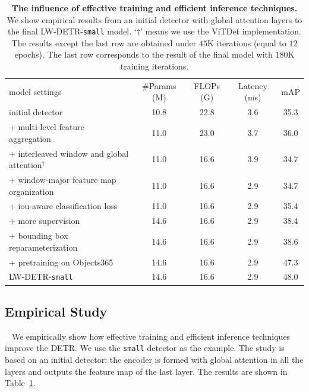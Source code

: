\documentclass[runningheads]{llncs}
\begin{document}
\begin{table}[t]
  \centering
    \setlength{\tabcolsep}{8pt}
    \renewcommand{\arraystretch}{1.41}
    \tiny
    \caption{\textbf{The influence of
    effective training and efficient inference techniques.} We show empirical results from an initial detector with global attention layers to the final LW-DETR-\texttt{small} model. `$\dagger$' means we use the ViTDet implementation. The results except the last row are obtained under $45$K iterations
    (equal to $12$ epochs). 
    The last row corresponds to the result of the final model with $180$K training iterations.}
    \vspace{-2mm}
  \begin{tabular}{l|ccc|c}
    model settings & \#Params (M) & FLOPs (G) & Latency (ms) & mAP \\
    \shline
    initial detector & 10.8 & 22.8 & 3.6 & 35.3 \\
    \hline
    + multi-level feature aggregation & 11.0 & 23.0 & 3.7 & 36.0 \\
    + interleaved window and global attention$^\dagger$ & 11.0 & 16.6 & 3.9 & 34.7 \\
    + window-major feature map organization & 11.0 & 16.6 & 2.9 & 34.7 \\
    \hline
    + iou-aware classification loss & 11.0 & 16.6 & 2.9 & 35.4 \\
    + more supervision & 14.6 & 16.6 & 2.9 & 38.4 \\
    + bounding box reparameterization & 14.6 & 16.6 & 2.9 & 38.6 \\
    + pretraining on Objects365 & 14.6 & 16.6 & 2.9 & 47.3 \\
    \hline
    LW-DETR-\texttt{small} & 14.6 & 16.6 & 2.9 & 48.0 \\
  \end{tabular}
  \label{tab:empirical_study}
  \vspace{-3mm}
\end{table}


\subsection{Empirical Study}~\label{sec:empirical_study}
We empirically show how effective training and efficient inference techniques improve the DETR. 
We use the \texttt{small} detector as the example. The study is based on an initial detector: the encoder is formed with global attention in all the layers and outputs the feature map of the last layer. The results are shown in Table~\ref{tab:empirical_study}.
\end{document}
